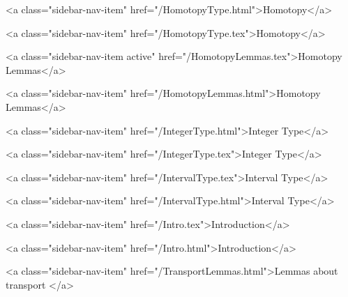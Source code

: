       
        
          <a class="sidebar-nav-item" href="/HomotopyType.html">Homotopy</a>
        
      
    
      
        
          <a class="sidebar-nav-item" href="/HomotopyType.tex">Homotopy</a>
        
      
    
      
        
          <a class="sidebar-nav-item active" href="/HomotopyLemmas.tex">Homotopy Lemmas</a>
        
      
    
      
        
          <a class="sidebar-nav-item" href="/HomotopyLemmas.html">Homotopy Lemmas</a>
        
      
    
      
        
          <a class="sidebar-nav-item" href="/IntegerType.html">Integer Type</a>
        
      
    
      
        
          <a class="sidebar-nav-item" href="/IntegerType.tex">Integer Type</a>
        
      
    
      
        
          <a class="sidebar-nav-item" href="/IntervalType.tex">Interval Type</a>
        
      
    
      
        
          <a class="sidebar-nav-item" href="/IntervalType.html">Interval Type</a>
        
      
    
      
        
          <a class="sidebar-nav-item" href="/Intro.tex">Introduction</a>
        
      
    
      
        
          <a class="sidebar-nav-item" href="/Intro.html">Introduction</a>
        
      
    
      
        
          <a class="sidebar-nav-item" href="/TransportLemmas.html">Lemmas about transport </a>
        
      
    
